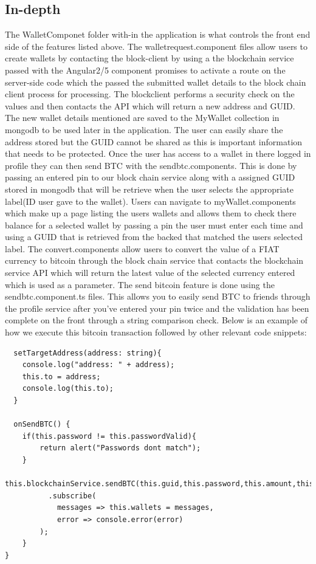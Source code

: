 \subsection{In-depth}
The WalletComponet folder with-in the application is what controls the front end side of the features listed above. The walletrequest.component files allow users to create wallets by contacting the block-client by using a the blockchain service passed with the Angular2/5 component promises to activate a route on the server-side code which the passed the submitted wallet details to the block chain client process for processing. The blockclient performs a security check on the values and then contacts the API which will return a new address and GUID. The new wallet details mentioned are saved to the MyWallet collection in mongodb to be used later in the application. The user can easily share the address stored but the GUID cannot be shared as this is important information that needs to be protected. Once the user has access to a wallet in there logged in profile they can then send BTC with the sendbtc.components. This is done by passing an entered pin to our block chain service along with a assigned GUID stored in mongodb that will be retrieve when the user selects the appropriate label(ID user gave to the wallet). Users can navigate to myWallet.components which make up a page listing the users wallets and allows them to check there balance for a selected wallet by passing a pin the user must enter each time and using a GUID that is retrieved from the backed that matched the users selected label. The convert.components allow users to convert the value of a FIAT currency to bitcoin through the block chain service that contacts the blockchain service API which will return the latest value of the selected currency entered which is used as a parameter. The send bitcoin feature is done using the sendbtc.component.ts files. This allows you to easily send BTC to friends through the profile service after you've entered your pin twice and the validation has been complete on the front through a string comparison check. Below is an example of how we execute this bitcoin transaction followed by other relevant code snippets:


\begin{lstlisting}
  setTargetAddress(address: string){
    console.log("address: " + address);
    this.to = address;
    console.log(this.to);
  }

  onSendBTC() {
    if(this.password != this.passwordValid){
        return alert("Passwords dont match");
    }
    this.blockchainService.sendBTC(this.guid,this.password,this.amount,this.to)
          .subscribe(
            messages => this.wallets = messages,
            error => console.error(error)
        );
    }
}
\end{lstlisting}

